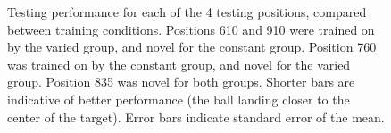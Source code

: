 \documentclass[
  12pt,
  letterpaper,
]{article}
\begin{document}
\begin{figure}


\caption{\label{fig-IGAS_Testing1}Testing performance for each of the 4
testing positions, compared between training conditions. Positions 610
and 910 were trained on by the varied group, and novel for the constant
group. Position 760 was trained on by the constant group, and novel for
the varied group. Position 835 was novel for both groups. Shorter bars
are indicative of better performance (the ball landing closer to the
center of the target). Error bars indicate standard error of the mean.}

\end{figure}%

\hfill\break
\hfill\break

\begin{table}

\caption{\label{tbl-IGAS_Table1}}


\end{table}%
\end{document}
